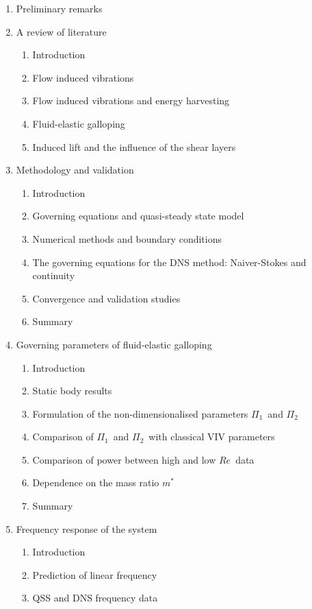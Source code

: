 \documentclass[authoryear,12pt]{article}
\newcommand{\mstar}{\ensuremath{m^{*}}}
\newcommand{\reynoldsnumber}{\ensuremath{Re}}
\newcommand{\massstiff}{\ensuremath{\Pi_1}}
\newcommand{\massdamp}{\ensuremath{\Pi_2}}
\begin{document}
\begin{enumerate}
	
	\item Preliminary remarks 
	\item A review of literature
		\begin{enumerate}[i]
		\item Introduction
		\item Flow induced vibrations 
		\item Flow induced vibrations and energy harvesting
		\item Fluid-elastic galloping
		\item Induced lift and the influence of the shear layers 
	\end{enumerate}
	\item Methodology and validation
	\begin{enumerate}[i]
		\item Introduction
		\item Governing equations and quasi-steady state model 
		\item Numerical methods and boundary conditions 
		\item The governing equations for the DNS method: Naiver-Stokes and continuity
		\item Convergence and validation studies 
		\item Summary
	\end{enumerate}	
	\item Governing parameters of  fluid-elastic galloping
	\begin{enumerate}[i]
		\item Introduction 
		\item Static body results 
		\item Formulation of the non-dimensionalised parameters \massstiff \ and \massdamp 
		\item Comparison of \massstiff \ and \massdamp \ with classical VIV parameters
		\item Comparison of power between high and low \reynoldsnumber\ data
		\item Dependence on the mass ratio \mstar
		\item Summary 
	\end{enumerate}	
	\item Frequency response of the system
	\begin{enumerate}[i]
		\item Introduction 
		\item Prediction of linear frequency 
		\item QSS and DNS frequency data 

\end{enumerate}
\end{enumerate}
\end{document}
